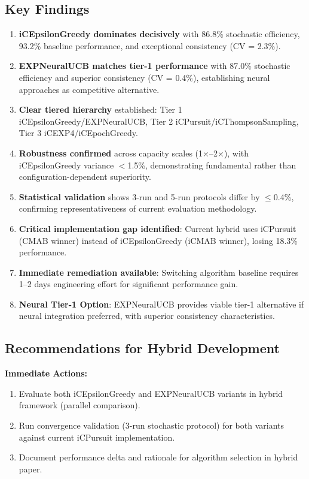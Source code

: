 \documentclass[12pt,a4paper]{article}
\newcommand{\primarytext}[1]{\textcolor{primaryblue}{\textbf{#1}}}
\newcommand{\secondarytext}[1]{\textcolor{secondaryblue}{\textbf{#1}}}
\newcommand{\success}[1]{\textcolor{accentgreen}{\textbf{#1}}}
\newcommand{\warning}[1]{\textcolor{warningred}{\textbf{#1}}}
\newcommand{\legacy}[1]{\textcolor{legacycolor}{\textbf{#1}}}
\begin{document}
\subsection{Key Findings}
\begin{enumerate}
\item \primarytext{iCEpsilonGreedy dominates decisively} with 86.8\% stochastic efficiency, 93.2\% baseline performance, and exceptional consistency (CV = 2.3\%).
\item \legacy{EXPNeuralUCB matches tier-1 performance} with 87.0\% stochastic efficiency and superior consistency (CV = 0.4\%), establishing neural approaches as competitive alternative.
\item \secondarytext{Clear tiered hierarchy} established: Tier 1 iCEpsilonGreedy/EXPNeuralUCB, Tier 2 iCPursuit/iCThompsonSampling, Tier 3 iCEXP4/iCEpochGreedy.
\item \success{Robustness confirmed} across capacity scales (1$\times$--2$\times$), with iCEpsilonGreedy variance $<$1.5\%, demonstrating fundamental rather than configuration-dependent superiority.
\item \success{Statistical validation} shows 3-run and 5-run protocols differ by $\leq$0.4\%, confirming representativeness of current evaluation methodology.
\item \warning{Critical implementation gap identified}: Current hybrid uses iCPursuit (CMAB winner) instead of iCEpsilonGreedy (iCMAB winner), losing 18.3\% performance.
\item \success{Immediate remediation available}: Switching algorithm baseline requires 1--2 days engineering effort for significant performance gain.
\item \success{Neural Tier-1 Option}: EXPNeuralUCB provides viable tier-1 alternative if neural integration preferred, with superior consistency characteristics.
\end{enumerate}

\subsection{Recommendations for Hybrid Development}

\textbf{Immediate Actions:}
\begin{enumerate}
\item Evaluate both iCEpsilonGreedy and EXPNeuralUCB variants in hybrid framework (parallel comparison).
\item Run convergence validation (3-run stochastic protocol) for both variants against current iCPursuit implementation.
\item Document performance delta and rationale for algorithm selection in hybrid paper.
\end{enumerate}
\end{document}
